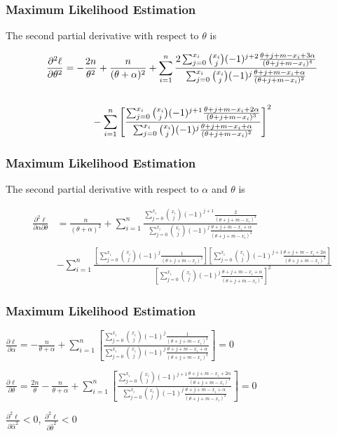 \documentclass{beamer}
\begin{document}
\begin{frame}
\frametitle{Maximum Likelihood Estimation}
The second partial derivative with respect to $\theta$ is

\smallskip
\small
\[
\begin{split}
\frac{\partial^2 \ell}{\partial \theta^2}&= -\frac{2n}{\theta^2} + \frac{n}{(\theta+\alpha)^2}+ \sum\limits_{i=1}^n \frac{2\sum_{j=0}^{x_{i}} {x_{i} \choose j} (-1)^{j+2} \frac{\theta+j+m-x_{i}+3\alpha}{(\theta+j+m-x_{i})^4}}{ \sum_{j=0}^{x_{i}} {x_{i} \choose j} (-1)^{j} \frac{\theta+j+m-x_{i}+\alpha}{(\theta+j+m-x_{i})^2}}\\
\\[0.5mm]&\hspace{10mm}- \sum\limits_{i=1}^n \left[ \frac{\sum_{j=0}^{x_{i}} {x_{i} \choose j} (-1)^{j+1} \frac{\theta+j+m-x_{i}+2\alpha}{(\theta+j+m-x_{i})^3}}{ \sum_{j=0}^{x_{i}} {x_{i} \choose j} (-1)^{j} \frac{\theta+j+m-x_{i}+\alpha}{(\theta+j+m-x_{i})^2}} \right] ^2
\end{split}
\]
\end{frame}

\begin{frame}
\frametitle{Maximum Likelihood Estimation}
The second partial derivative with respect to $\alpha$ and $\theta$ is

\smallskip
\small
\[
\begin{split}
\frac{\partial^2 \ell}{\partial \alpha \partial \theta}&= \frac{n}{(\theta+\alpha)^2} + \sum\limits_{i=1}^n \frac{\sum_{j=0}^{x_{i}} {x_{i} \choose j} (-1)^{j+1} \frac{2}{(\theta+j+m-x_{i})^3}}{ \sum_{j=0}^{x_{i}} {x_{i} \choose j} (-1)^{j} \frac{\theta+j+m-x_{i}+\alpha}{(\theta+j+m-x_{i})^2}}\\
\\[0.5mm]&- \sum\limits_{i=1}^n  \frac{\left[\sum_{j=0}^{x_{i}} {x_{i} \choose j} (-1)^{j} \frac{1}{(\theta+j+m-x_{i})^2}\right] \left[\sum_{j=0}^{x_{i}} {x_{i} \choose j} (-1)^{j+1} \frac{\theta+j+m-x_{i}+2\alpha}{(\theta+j+m-x_{i})^3}\right]}{\left[ \sum_{j=0}^{x_{i}} {x_{i} \choose j} (-1)^{j} \frac{\theta+j+m-x_{i}+\alpha}{(\theta+j+m-x_{i})^2}\right] ^2} 
\end{split}
\]
\end{frame}

\begin{frame}
\frametitle{Maximum Likelihood Estimation}
\Large
$\frac{\partial \ell}{\partial \alpha}= -\frac{n}{\theta+\alpha} + \sum\limits_{i=1}^n \left[ \frac{\sum_{j=0}^{x_{i}} {x_{i} \choose j} (-1)^{j} \frac{1}{(\theta+j+m-x_{i})^2}}{\sum_{j=0}^{x_{i}} {x_{i} \choose j} (-1)^{j} \frac{\theta+j+m-x_{i}+\alpha}{(\theta+j+m-x_{i})^2}} \right]=0$

\bigskip
$\frac{\partial \ell}{\partial \theta}= \frac{2n}{\theta} - \frac{n}{\theta+\alpha} + \sum\limits_{i=1}^n \left[  \frac{\sum_{j=0}^{x_{i}} {x_{i} \choose j} (-1)^{j+1} \frac{\theta+j+m-x_{i}+2\alpha}{(\theta+j+m-x_{i})^3}}{\sum_{j=0}^{x_{i}} {x_{i} \choose j} (-1)^{j} \frac{\theta+j+m-x_{i}+\alpha}{(\theta+j+m-x_{i})^2}} \right]=0$

\bigskip
$\frac{\partial^2 \ell}{\partial \hat{\alpha}^2}<0$,  \hspace{5mm} $\frac{\partial^2 \ell}{\partial \hat{\theta}^2}<0 $
\end{frame}
\end{document}
